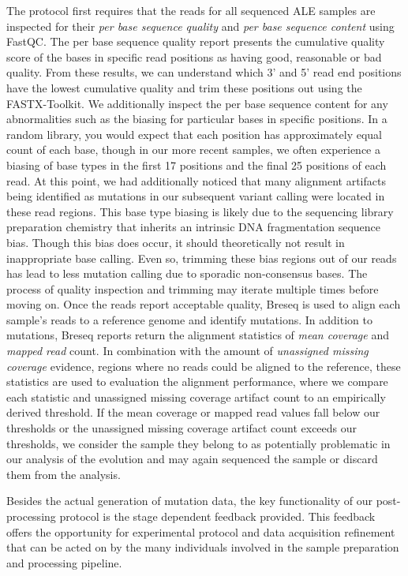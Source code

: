 \documentclass[12pt,final,masters,chapterheads]{ucsd}  %
\begin{document}
The protocol first requires that the reads for all sequenced ALE samples are inspected for their \textit{per base sequence quality} and \textit{per base sequence content} using FastQC. The per base sequence quality report presents the cumulative quality score of the bases in specific read positions as having good, reasonable or bad quality. From these results, we can understand which 3' and 5' read end positions have the lowest cumulative quality and trim these positions out using the FASTX-Toolkit. We additionally inspect the per base sequence content for any abnormalities such as the biasing for particular bases in specific positions. In a random library, you would expect that each position has approximately equal count of each base, though in our more recent samples, we often experience a biasing of base types in the first 17 positions and the final 25 positions of each read. At this point, we had additionally noticed that many alignment artifacts being identified as mutations in our subsequent variant calling were located in these read regions. This base type biasing is likely due to the sequencing library preparation chemistry that inherits an intrinsic DNA fragmentation sequence bias. Though this bias does occur, it should theoretically not result in inappropriate base calling. Even so, trimming these bias regions out of our reads has lead to less mutation calling due to sporadic non-consensus bases. The process of quality inspection and trimming may iterate multiple times before moving on. Once the reads report acceptable quality, Breseq is used to align each sample's reads to a reference genome and identify mutations. In addition to mutations, Breseq reports return the alignment statistics of \textit{mean coverage} and \textit{mapped read} count. In combination with the amount of \textit{unassigned missing coverage} evidence, regions where no reads could be aligned to the reference, these statistics are used to evaluation the alignment performance, where we compare each statistic and unassigned missing coverage artifact count to an empirically derived threshold. If the mean coverage or mapped read values fall below our thresholds or the unassigned missing coverage artifact count exceeds our thresholds, we consider the sample they belong to as potentially problematic in our analysis of the evolution and may again sequenced the sample or discard them from the analysis.

Besides the actual generation of mutation data, the key functionality of our post-processing protocol is the stage dependent feedback provided. This feedback offers the opportunity for experimental protocol and data acquisition refinement that can be acted on by the many individuals involved in the sample preparation and processing pipeline.
\end{document}
